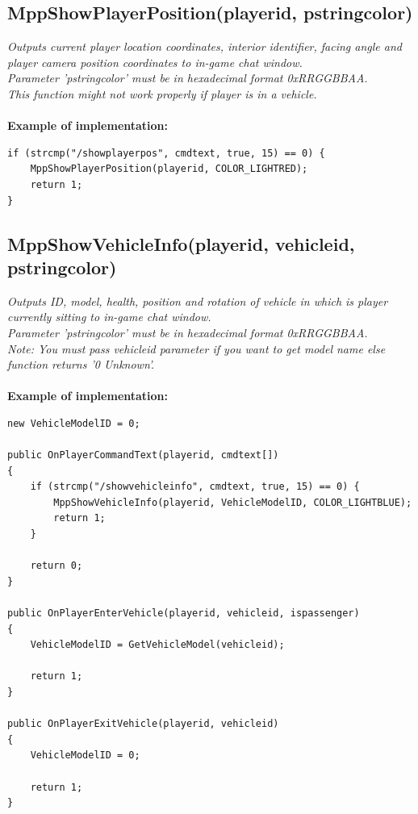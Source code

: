 \documentclass{article}
\begin{document}
\newpage
\subsection{MppShowPlayerPosition(playerid, pstringcolor)}

\textit{Outputs current player location coordinates, interior identifier, facing angle and player camera position coordinates to in-game chat window.
\\Parameter 'pstringcolor' must be in hexadecimal format 0xRRGGBBAA.
\\This function might not work properly if player is in a vehicle.}
\\
\\
\textbf{Example of implementation:}
\begin{verbatim}
if (strcmp("/showplayerpos", cmdtext, true, 15) == 0) {
    MppShowPlayerPosition(playerid, COLOR_LIGHTRED);
    return 1;
}
\end{verbatim}


\subsection{MppShowVehicleInfo(playerid, vehicleid, pstringcolor)}

\textit{Outputs ID, model, health, position and rotation of vehicle in which is player currently sitting to in-game chat window.
\\Parameter 'pstringcolor' must be in hexadecimal format 0xRRGGBBAA.
\\Note: You must pass vehicleid parameter if you want to get model name else function returns '0 Unknown'.}
\\
\\
\textbf{Example of implementation:}
\begin{verbatim}
new VehicleModelID = 0;

public OnPlayerCommandText(playerid, cmdtext[])
{
    if (strcmp("/showvehicleinfo", cmdtext, true, 15) == 0) {
        MppShowVehicleInfo(playerid, VehicleModelID, COLOR_LIGHTBLUE);
        return 1;
    }

    return 0;
}

public OnPlayerEnterVehicle(playerid, vehicleid, ispassenger)
{
    VehicleModelID = GetVehicleModel(vehicleid);

    return 1;
}

public OnPlayerExitVehicle(playerid, vehicleid)
{
    VehicleModelID = 0;

    return 1;
}
\end{verbatim}
\end{document}
